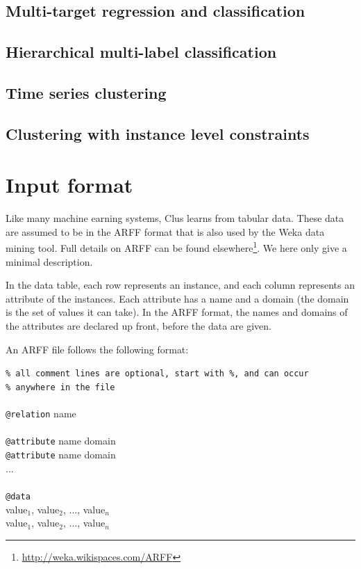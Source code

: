 \documentclass[a4paper]{report}
\begin{document}
\section{Multi-target regression and classification}

\section{Hierarchical multi-label classification}

\section{Time series clustering}

\section{Clustering with instance level constraints}

\chapter{Input format}

Like many machine earning systems, Clus learns from tabular data.
These data are assumed to be in the ARFF format that is also used by the Weka data mining tool.  Full details on ARFF can be found elsewhere\footnote{\url{http://weka.wikispaces.com/ARFF}}.
We here only give a minimal description.

In the data table, each row represents an instance, and each column represents an attribute of the instances.  Each attribute has a name and a domain (the domain is the set of values it can take).  In the ARFF format, the names and domains of the attributes are declared up front, before the data are given.

An ARFF file follows the following format:

\begin{tabbing}
{\tt \% all comment lines are optional, start with \%, and can occur }\\
{\tt \% anywhere in the file}\\
\\
{\tt @relation} name\\
\\
{\tt @attribute} name domain\\
{\tt @attribute} name domain\\
...\\
\\
{\tt @data}\\
value$_1$, value$_2$, ..., value$_n$\\
value$_1$, value$_2$, ..., value$_n$\\
\end{tabbing}
\end{document}
